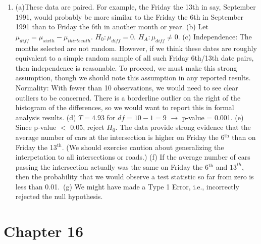 \documentclass[
  10pt,
  openany]{book}
\begin{document}
\begin{enumerate}
  \addtocounter{enumi}{1}
\item
  (a)These data are paired. For example, the Friday the 13th in say, September 1991, would probably be more similar to the Friday the 6th in September 1991 than to Friday the 6th in another month or year. (b) Let \(\mu_{\textit{diff}} = \mu_{sixth} - \mu_{thirteenth}\). \(H_0: \mu_{\textit{diff}} = 0\). \(H_A: \mu_{\textit{diff}} \ne 0\). (c) Independence: The months selected are not random. However, if we think these dates are roughly equivalent to a simple random sample of all such Friday 6th/13th date pairs, then independence is reasonable. To proceed, we must make this strong assumption, though we should note this assumption in any reported results. Normality: With fewer than 10 observations, we would need to see clear outliers to be concerned. There is a borderline outlier on the right of the histogram of the differences, so we would want to report this in formal analysis results. (d) \(T = 4.93\) for \(df = 10 - 1 = 9\) \(\to\) p-value = 0.001. (e) Since p-value \(<\) 0.05, reject \(H_0\). The data provide strong evidence that the average number of cars at the intersection is higher on Friday the 6\(^{\text{th}}\) than on Friday the 13\(^{\text{th}}\). (We should exercise caution about generalizing the interpetation to all intersections or roads.) (f) If the average number of cars passing the intersection actually was the same on Friday the 6\(^{\text{th}}\) and \(13^{th}\), then the probability that we would observe a test statistic so far from zero is less than 0.01.~(g) We might have made a Type 1 Error, i.e., incorrectly rejected the null hypothesis.

  \addtocounter{enumi}{1}
\end{enumerate}

\hypertarget{exercise-solutions-22}{%
\section{Chapter 16}\label{exercise-solutions-22}}
\end{document}
